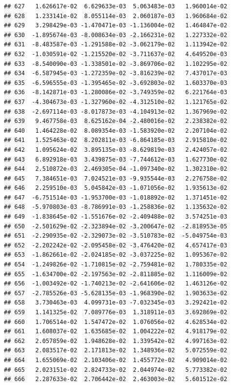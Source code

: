 \documentclass[
]{article}
\begin{document}
\begin{verbatim}
## 627   1.626617e-02  6.629633e-03  5.063483e-03   1.960014e-02
## 628   1.233141e-02  8.055114e-03  2.060187e-03   1.960684e-02
## 629   3.298429e-03 -1.470471e-03 -1.136004e-02   1.464847e-02
## 630  -1.895674e-03 -8.008634e-03 -2.166231e-02   1.227332e-02
## 631  -8.483587e-03 -1.291588e-02 -3.062179e-02   1.113942e-02
## 632  -1.030591e-02 -1.215520e-02 -3.711637e-02   4.649520e-03
## 633  -8.540090e-03 -1.338501e-02 -3.869706e-02   1.102295e-02
## 634  -6.587945e-03 -1.272359e-02 -3.816239e-02   7.437017e-03
## 635  -6.596555e-03 -1.395465e-02 -3.692803e-02   1.603370e-03
## 636  -8.142871e-03 -1.280086e-02 -3.749359e-02   6.221764e-03
## 637  -4.304673e-03 -1.327960e-02 -4.312510e-02   1.121765e-02
## 638  -2.697114e-03 -8.017873e-03 -4.104913e-02   1.367969e-02
## 639   9.467758e-03  8.625162e-04 -2.480016e-02   2.238382e-02
## 640   1.464228e-02  8.089354e-03 -1.583920e-02   2.207104e-02
## 641   1.525463e-02  8.202811e-03 -6.864185e-03   2.915810e-02
## 642   1.095624e-02  3.895135e-03 -8.629819e-03   2.424057e-02
## 643   6.892918e-03  3.439875e-03 -7.744612e-03   1.627730e-02
## 644   2.510872e-03  2.469305e-04 -1.097340e-02   1.302310e-02
## 645   7.384651e-03  7.024521e-03 -9.935544e-03   2.276758e-02
## 646   2.259510e-03  5.045842e-03 -1.071056e-02   1.935613e-02
## 647  -6.751514e-03 -1.953700e-03 -1.018892e-02   1.371451e-02
## 648  -5.970803e-03 -8.786991e-03 -1.258836e-02   1.135632e-02
## 649  -1.838645e-02 -1.551676e-02 -2.409488e-02   3.574251e-03
## 650  -2.501629e-02 -2.323894e-02 -3.200647e-02  -2.818953e-05
## 651  -2.290935e-02 -2.329073e-02 -3.510783e-02  -5.049754e-03
## 652  -2.202242e-02 -2.095458e-02 -3.476420e-02   4.657417e-03
## 653  -1.862661e-02 -2.024185e-02 -3.037225e-02   1.095367e-02
## 654  -1.249826e-02 -1.710815e-02 -2.759481e-02   1.780335e-02
## 655  -1.634700e-02 -2.197563e-02 -2.811885e-02   1.116009e-02
## 656  -1.003492e-02 -1.740213e-02 -2.641606e-02   1.463126e-02
## 657  -2.785526e-03 -5.628135e-03 -1.968390e-02   1.903633e-02
## 658   3.730463e-03  4.099731e-03 -7.032345e-03   3.292421e-02
## 659   1.141325e-02  7.089776e-03  1.318911e-03   3.692869e-02
## 660   1.706514e-02  1.547472e-02  1.076056e-02   4.628534e-02
## 661   1.608037e-02  1.635685e-02  1.004222e-02   4.918179e-02
## 662   2.057859e-02  1.948628e-02  1.339542e-02   4.997163e-02
## 663   2.083517e-02  2.171813e-02  1.348936e-02   5.072559e-02
## 664   1.655069e-02  2.103406e-02  1.455772e-02   4.909014e-02
## 665   2.023151e-02  2.824733e-02  2.044974e-02   5.773382e-02
## 666   2.287633e-02  2.706442e-02  2.463003e-02   5.601512e-02

\end{verbatim}
\end{document}
